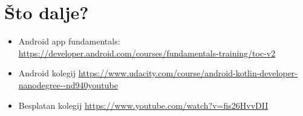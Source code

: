 \documentclass[11pt,a4paper,twoside]{article}
\begin{document}
\section{Što dalje?}

	\begin{itemize}
		\item Android app fundamentals: \url{https://developer.android.com/courses/fundamentals-training/toc-v2}
		\item Android kolegij \url{https://www.udacity.com/course/android-kotlin-developer-nanodegree--nd940youtube }
		\item Besplatan kolegij \url{https://www.youtube.com/watch?v=fis26HvvDII}
	\end{itemize}


	
\end{document}
